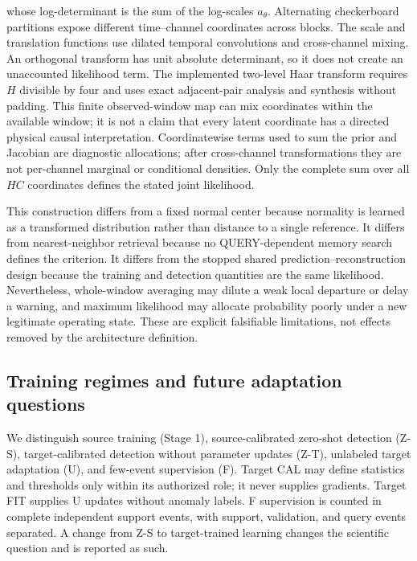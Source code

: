 \documentclass[
  english,
]{article}
\begin{document}
whose log-determinant is the sum of the log-scales \(a_\theta\).
Alternating checkerboard partitions expose different time--channel
coordinates across blocks. The scale and translation functions use
dilated temporal convolutions and cross-channel mixing. An orthogonal
transform has unit absolute determinant, so it does not create an
unaccounted likelihood term. The implemented two-level Haar transform
requires \(H\) divisible by four and uses exact adjacent-pair analysis
and synthesis without padding. This finite observed-window map can mix
coordinates within the available window; it is not a claim that every
latent coordinate has a directed physical causal interpretation.
Coordinatewise terms used to sum the prior and Jacobian are diagnostic
allocations; after cross-channel transformations they are not
per-channel marginal or conditional densities. Only the complete sum
over all \(H C\) coordinates defines the stated joint likelihood.

This construction differs from a fixed normal center because normality
is learned as a transformed distribution rather than distance to a
single reference. It differs from nearest-neighbor retrieval because no
QUERY-dependent memory search defines the criterion. It differs from the
stopped shared prediction--reconstruction design because the training
and detection quantities are the same likelihood. Nevertheless,
whole-window averaging may dilute a weak local departure or delay a
warning, and maximum likelihood may allocate probability poorly under a
new legitimate operating state. These are explicit falsifiable
limitations, not effects removed by the architecture definition.

\subsection{Training regimes and future adaptation
questions}\label{training-regimes-and-future-adaptation-questions}

We distinguish source training (Stage 1), source-calibrated zero-shot
detection (Z-S), target-calibrated detection without parameter updates
(Z-T), unlabeled target adaptation (U), and few-event supervision (F).
Target CAL may define statistics and thresholds only within its
authorized role; it never supplies gradients. Target FIT supplies U
updates without anomaly labels. F supervision is counted in complete
independent support events, with support, validation, and query events
separated. A change from Z-S to target-trained learning changes the
scientific question and is reported as such.
\end{document}
